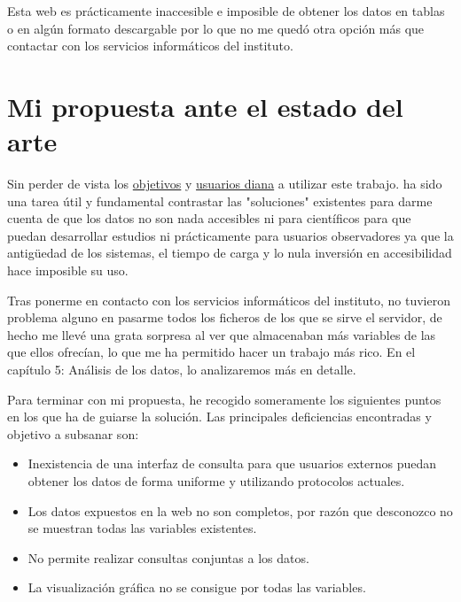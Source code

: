 Esta web es prácticamente inaccesible e imposible de obtener los datos en tablas o en algún formato descargable por lo que no me quedó otra opción más que contactar con los servicios informáticos del instituto.


\section{Mi propuesta ante el estado del arte}

Sin perder de vista los \hyperref[sec:obj]{objetivos} y \hyperref[sec:usu]{usuarios diana} a utilizar este trabajo.  ha sido una tarea útil y fundamental contrastar las "soluciones" existentes para darme cuenta de que los datos no son nada accesibles ni para científicos para que puedan desarrollar estudios ni prácticamente para usuarios observadores ya que la antigüedad de los sistemas, el tiempo de carga y lo nula inversión en accesibilidad hace imposible su uso.

Tras ponerme en contacto con los servicios informáticos del instituto, no tuvieron problema alguno en pasarme todos los ficheros de los que se sirve el servidor, de hecho me llevé una grata sorpresa al ver que almacenaban más variables de las que ellos ofrecían, lo que me ha permitido hacer un trabajo más rico. En el capítulo 5: Análisis de los datos, lo analizaremos más en detalle.


Para terminar con mi propuesta, he recogido someramente los siguientes puntos en los que ha de guiarse la solución. Las principales deficiencias encontradas y objetivo a subsanar son:
\begin{itemize}
    \item Inexistencia de una interfaz de consulta para que usuarios externos puedan obtener los datos de forma uniforme y utilizando protocolos actuales.
    \item Los datos expuestos en la web no son completos, por razón que desconozco no se muestran todas las variables existentes.
    \item No permite realizar consultas conjuntas a los datos.
    \item La visualización gráfica no se consigue por todas las variables.
\end{itemize}
